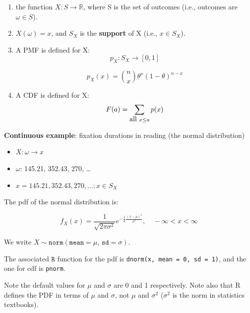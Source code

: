 \documentclass[12pt]{article}
\begin{document}
\begin{enumerate}
\item the function $X: S\rightarrow \mathbb{R}$, where S is the set of outcomes (i.e., outcomes are $\omega \in S$).
\item $X(\omega) = x$, and $S_X$ is the \textbf{support} of X (i.e., $x\in S_X$).
\item A PMF is defined for X:
\begin{equation}
p_X : S_X \rightarrow [0, 1] 
\end{equation}

\begin{equation}
p_X(x)= {n \choose x} \theta^x (1-\theta)^{n-x} 
\end{equation} 


\item A CDF is defined for X:
\begin{equation}
F(a)=\sum_{\hbox{all } x \leq a} p(x)
\end{equation}
\end{enumerate}

\textbf{Continuous example}: fixation durations in reading (the normal distribution)

\begin{itemize}
  \item $X: \omega \rightarrow x$
  \item $\omega$: 145.21, 352.43, 270, \dots 
  \item $x=145.21, 352.43, 270,\dots; x \in S_X$
\end{itemize}

The pdf of the normal distribution is:

\begin{equation}
f_{X}(x)=\frac{1}{\sqrt{2\pi \sigma^2}}
e^{-\frac{1}{2}\frac{(x-\mu)^{2}}{\sigma^2}},\quad -\infty < x < \infty
\end{equation}

We write $X\sim \mathtt{norm}(\mathtt{mean}=\mu,\,\mathtt{sd}=\sigma)$.

The associated $\texttt{R}$ function for the pdf is \texttt{dnorm(x, mean = 0, sd = 1)}, and the one for cdf is \texttt{pnorm}.

Note the default values for $\mu$ and $\sigma$ are 0 and 1 respectively. Note also that R defines the PDF in terms of $\mu$ and $\sigma$, not $\mu$ and $\sigma^2$ ($\sigma^2$ is the norm in statistics textbooks).
\end{document}
